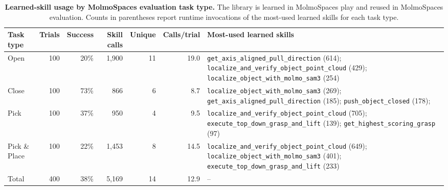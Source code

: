 \documentclass{llmxive}
\providecommand{\arraystretch}{1.05}
\begin{document}
\begin{table}[t]
\noindent
\vspace{1.5em}
\begin{minipage}{0.9\textwidth}

\small
\setlength{\tabcolsep}{2pt}
\renewcommand{\arraystretch}{1.15}

\begin{tabularx}{\textwidth}{lrrrrr X}
\toprule
\textbf{Task type} & \textbf{Trials} & \textbf{Success} & \textbf{Skill calls} & \textbf{Unique} & \textbf{Calls/trial} & \textbf{Most-used learned skills} \\
\midrule
Open & 100 & 20\% & 1,900 & 11 & 19.0 &
\texttt{get\_axis\_aligned\_pull\_direction} (614);
\texttt{localize\_and\_verify\_object\_point\_cloud} (429);
\texttt{localize\_object\_with\_molmo\_sam3} (254) \\

Close & 100 & 73\% & 866 & 6 & 8.7 &
\texttt{localize\_object\_with\_molmo\_sam3} (269);
\texttt{get\_axis\_aligned\_pull\_direction} (185);\newline
\texttt{push\_object\_closed} (178); \\

Pick & 100 & 37\% & 950 & 4 & 9.5 &
\texttt{localize\_and\_verify\_object\_point\_cloud} (705);
\texttt{execute\_top\_down\_grasp\_and\_lift} (139);
\texttt{get\_highest\_scoring\_grasp} (97) \\

Pick \& Place & 100 & 22\% & 1,453 & 8 & 14.5 &
\texttt{localize\_and\_verify\_object\_point\_cloud} (649);
\texttt{localize\_object\_with\_molmo\_sam3} (401);
\texttt{execute\_top\_down\_grasp\_and\_lift} (233) \\
\midrule
Total & 400 & 38\% & 5,169 & 14 & 12.9 & -- \\
\bottomrule
\end{tabularx}
\end{minipage}
\caption{
\textbf{Learned-skill usage by MolmoSpaces evaluation task type.}
The library is learned in MolmoSpaces play and reused in MolmoSpaces
evaluation. Counts in parentheses report runtime invocations of the most-used
learned skills for each task type.
}
\label{tab:eval_task_skill_usage}
\end{table}
\end{document}
